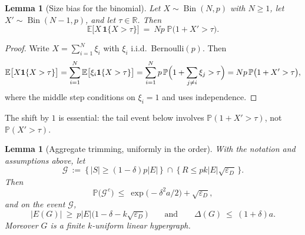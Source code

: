 \documentclass[11pt,a4paper]{amsart}
\theoremstyle{plain}
\newtheorem{lemma}[theorem]{Lemma}
\theoremstyle{definition}
\theoremstyle{remark}
\newcommand{\EE}{E}
\newcommand{\PP}{\mathbb{P}}
\newcommand{\EX}{\mathbb{E}}
\newcommand{\Bin}{\operatorname{Bin}}
\newcommand{\Deltaop}{\Delta}
\begin{document}
\begin{lemma}[Size bias for the binomial]
\label{lem:sizebias}
Let $X\sim\Bin(N,p)$ with $N\ge1$, let $X'\sim\Bin(N-1,p)$, and let $\tau\in\mathbb{R}$.
Then
\[
  \EX\bigl[X\,\mathbf{1}\{X>\tau\}\bigr]\ =\ Np\;\PP\bigl(1+X'>\tau\bigr).
\]
\end{lemma}

\begin{proof}
Write $X=\sum_{i=1}^{N}\xi_i$ with $\xi_i$ i.i.d.\ Bernoulli$(p)$. Then
\[
  \EX\bigl[X\mathbf{1}\{X>\tau\}\bigr]
  =\sum_{i=1}^{N}\EX\bigl[\xi_i\mathbf{1}\{X>\tau\}\bigr]
  =\sum_{i=1}^{N}p\,\PP\Bigl(1+\sum_{j\ne i}\xi_j>\tau\Bigr)
  =Np\,\PP\bigl(1+X'>\tau\bigr),
\]
where the middle step conditions on $\xi_i=1$ and uses independence.
\end{proof}

The shift by $1$ is essential: the tail event below involves
$\PP(1+X'>\tau)$, not $\PP(X'>\tau)$.

\begin{lemma}[Aggregate trimming, uniformly in the order]
\label{lem:trim}
With the notation and assumptions above, let
\[
  \mathcal{G}\ :=\ \bigl\{\,|S|\ge(1-\delta)p|\EE|\,\bigr\}
    \ \cap\ \bigl\{\,R\le pk|\EE|\sqrt{\varepsilon_D}\,\bigr\}.
\]
Then
\[
  \PP\bigl(\mathcal{G}^{\,c}\bigr)\ \le\
  \exp\bigl(-\delta^2a/2\bigr)+\sqrt{\varepsilon_D},
\]
and on the event $\mathcal{G}$,
\[
  |E(G)|\ \ge\ p|\EE|\bigl(1-\delta-k\sqrt{\varepsilon_D}\bigr)
  \qquad\text{and}\qquad
  \Deltaop(G)\ \le\ (1+\delta)a .
\]
Moreover $G$ is a finite $k$-uniform linear hypergraph.
\end{lemma}
\end{document}
